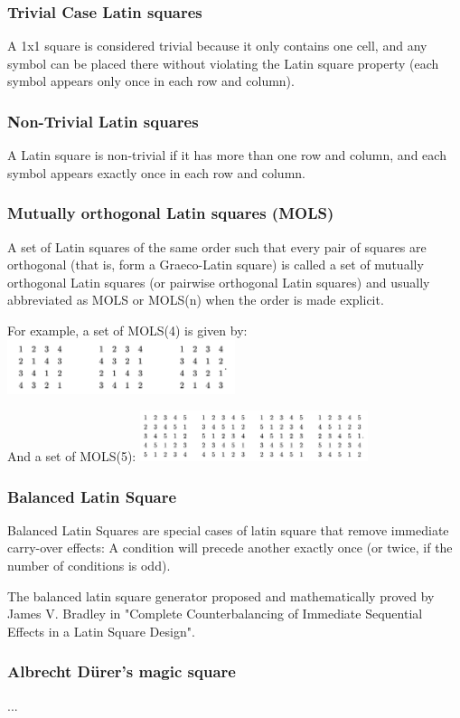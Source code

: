 \documentclass{beamer}
\begin{document}
\begin{frame}
\frametitle{Trivial Case Latin squares}
A 1x1 square is considered trivial because it only contains one cell, and any symbol can be placed there without violating the Latin square property (each symbol appears only once in each row and column).
\end{frame}

\begin{frame}
\frametitle{Non-Trivial Latin squares}
A Latin square is non-trivial if it has more than one row and column, and each symbol appears exactly once in each row and column.
\end{frame}

\begin{frame}
\frametitle{Mutually orthogonal Latin squares (MOLS)}
A set of Latin squares of the same order such that every pair of squares are orthogonal (that is, form a Graeco-Latin square) is called a set of mutually orthogonal Latin squares (or pairwise orthogonal Latin squares) and usually abbreviated as MOLS or MOLS(n) when the order is made explicit.

For example, a set of MOLS(4) is given by:
\includegraphics[width=0.5\textwidth]{img15}

And a set of MOLS(5):
\includegraphics[width=0.5\textwidth]{img16}
\end{frame}

\begin{frame}
\frametitle{Balanced Latin Square}
Balanced Latin Squares are special cases of latin square that remove immediate carry-over effects: A condition will precede another exactly once (or twice, if the number of conditions is odd).

The balanced latin square generator proposed and mathematically proved by James V. Bradley in "Complete Counterbalancing of Immediate Sequential Effects in a Latin Square Design".
\end{frame}

\begin{frame}
\frametitle{Albrecht Dürer's magic square}
...
\end{frame}
\end{document}
